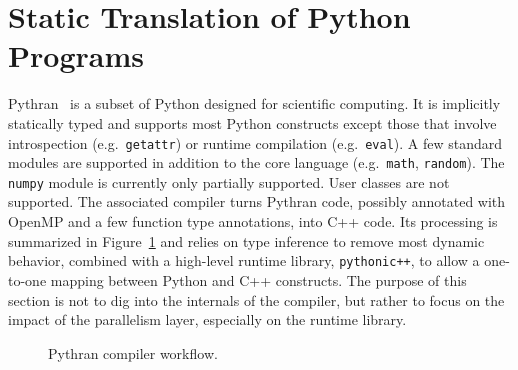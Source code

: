 \documentclass[conference]{IEEEtran}
\begin{document}
\section{Static Translation of Python Programs}\label{sec:python-static}

Pythran~\cite{pythran2013} is a subset of Python designed for scientific
computing. It is implicitly statically typed and supports most Python constructs
except those that involve introspection (e.g.\ \texttt{getattr}) or runtime
compilation (e.g.\ \texttt{eval}). A few standard modules are supported in
addition to the core language (e.g.\ \texttt{math}, \texttt{random}). The
\texttt{numpy} module is currently only partially supported. User classes are
not supported. The associated compiler turns Pythran code, possibly annotated
with OpenMP and a few function type annotations, into C++ code. Its processing
is summarized in Figure~\ref{fig:pythran-compiler} and relies on type inference
to remove most dynamic behavior, combined with a high-level runtime library,
\texttt{pythonic++}, to allow a one-to-one mapping between Python and C++
constructs. The purpose of this section is not to dig into the internals of the
compiler, but rather to focus on the impact of the parallelism layer, especially
on the runtime library.

\begin{figure}

\centering
{}

\caption{Pythran compiler workflow.}
\label{fig:pythran-compiler}
\end{figure}
\end{document}
